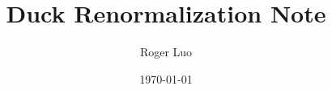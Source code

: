 \documentclass[11pt]{article}
\title{Duck Renormalization Note}
\author{Roger Luo}
\date{\today}
\begin{document}
\maketitle	
\pagebreak

\tableofcontents
\pagebreak





\end{document}
